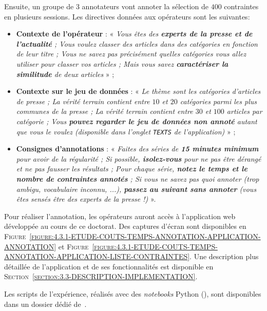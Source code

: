 			Ensuite, un groupe de $3$ annotateurs vont annoter la sélection de $400$ contraintes en plusieurs sessions.
			Les directives données aux opérateurs sont les suivantes:
			\begin{itemize}
				\item \textbf{Contexte de l'opérateur} :
				« \textit{Vous êtes des \textbf{experts de la presse et de l’actualité} ; Vous voulez classer des articles dans des catégories en fonction de leur titre ; Vous ne savez pas précisément quelles catégories vous allez utiliser pour classer vos articles ; Mais vous savez \textbf{caractériser la similitude} de deux articles} » ;
				\item \textbf{Contexte sur le jeu de données} :
				« \textit{Le thème sont les catégories d’articles de presse ; La vérité terrain contient entre $10$ et $20$ catégories parmi les plus communes de la presse ; La vérité terrain contient entre $30$ et $100$ articles par catégorie ; Vous \textbf{pouvez regarder le jeu de données non annoté} autant que vous le voulez (disponible dans l'onglet \texttt{TEXTS} de l'application)} » ;
				\item \textbf{Consignes d'annotations} :
				« \textit{Faites des séries de \textbf{15 minutes minimum} pour avoir de la régularité ; Si possible, \textbf{isolez-vous} pour ne pas être dérangé et ne pas fausser les résultats ; Pour chaque série, \textbf{notez le temps et le nombre de contraintes annotés} ; Si vous ne savez pas quoi annoter (trop ambigu, vocabulaire inconnu, ...), \textbf{passez au suivant sans annoter} (vous êtes sensés être des experts de la presse !)} ».
			\end{itemize}
			Pour réaliser l'annotation, les opérateurs auront accès à l'application web développée au cours de ce doctorat.
			Des captures d'écran sont disponibles en \textsc{Figure~\ref{figure:4.3.1-ETUDE-COUTS-TEMPS-ANNOTATION-APPLICATION-ANNOTATION}} et \textsc{Figure~\ref{figure:4.3.1-ETUDE-COUTS-TEMPS-ANNOTATION-APPLICATION-LISTE-CONTRAINTES}}.
			Une description plus détaillée de l'application et de ses fonctionnalités est disponible en \textsc{Section~\ref{section:3.3-DESCRIPTION-IMPLEMENTATION}}.
			
			
			\begin{leftBarInformation}
				Les scripts de l'expérience, réalisés avec des \textit{notebooks} Python (\cite{van-rossum-drake:2009:python-reference-manual}), sont disponibles dans un dossier dédié de~\cite{schild:2021:cognitivefactory-interactiveclusteringcomparativestudy}.
			\end{leftBarInformation}
			
